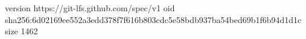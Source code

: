 version https://git-lfs.github.com/spec/v1
oid sha256:6d02169ee552a3edd378f7f616b803cdc5e58bdb937ba54bed69b1f6b94d1d1c
size 1462

